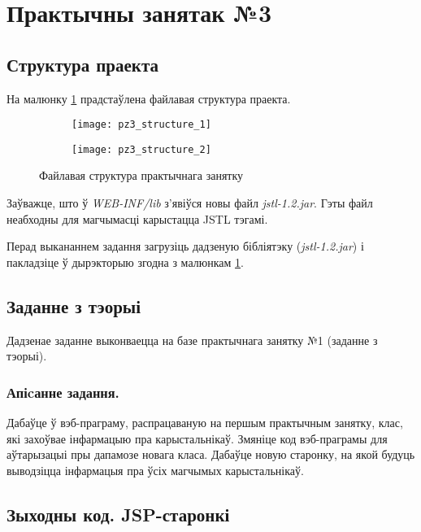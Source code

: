 \section{Практычны занятак №3}

\subsection{Структура праекта}

На малюнку \ref{img: pz3} прадстаўлена файлавая структура праекта.

\begin{figure}[h!]
\centering
\begin{subfigure}{0.5\textwidth}
    \centering
    \texttt{[image: pz3\_structure\_1]}
\end{subfigure}%
\begin{subfigure}{0.5\textwidth}
    \centering
    \texttt{[image: pz3\_structure\_2]}
\end{subfigure}
\caption{Файлавая структура практычнага занятку}
\label{img: pz3} 
\end{figure}

Заўважце, што ў \textit{WEB-INF/lib} з'явіўся новы файл
\textit{jstl-1.2.jar}. Гэты файл неабходны для магчымасці
карыстацца JSTL тэгамі.

Перад выкананнем задання загрузіць дадзеную бібліятэку
(\textit{jstl-1.2.jar}) і пакладзіце ў дырэкторыю згодна
з малюнкам \ref{img: pz3}.

\subsection{Заданне з тэорыі}

Дадзенае заданне выконваецца на базе практычнага занятку №1
(заданне з тэорыі).

\subsubsection{Апіcанне задання.}

Дабаўце ў вэб-праграму, распрацаваную на першым практычным занятку,
клас, які захоўвае інфармацыю пра карыстальнікаў. Змяніце код
вэб-праграмы для аўтарызацыі пры дапамозе новага класа.
Дабаўце новую старонку, на якой будуць выводзіцца інфармацыя пра ўсіх
магчымых карыстальнікаў.

\subsection{Зыходны код. JSP-старонкі}

